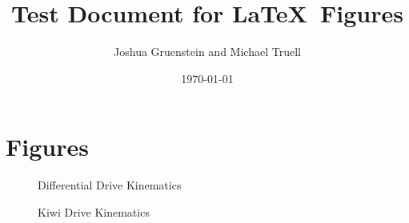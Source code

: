 \documentclass[a4paper]{article}
\title{Test Document for \LaTeX \ Figures}
\author{Joshua Gruenstein and Michael Truell}
\date{\today}
\begin{document}
	\maketitle

	\section{Figures}
	\centering

	\begin{figure}[ht]
		\centering
		
		\caption{Differential Drive Kinematics}
	\end{figure}

	\begin{figure}[ht]
		\centering
		
		\caption{Kiwi Drive Kinematics}
	\end{figure}
\end{document}
